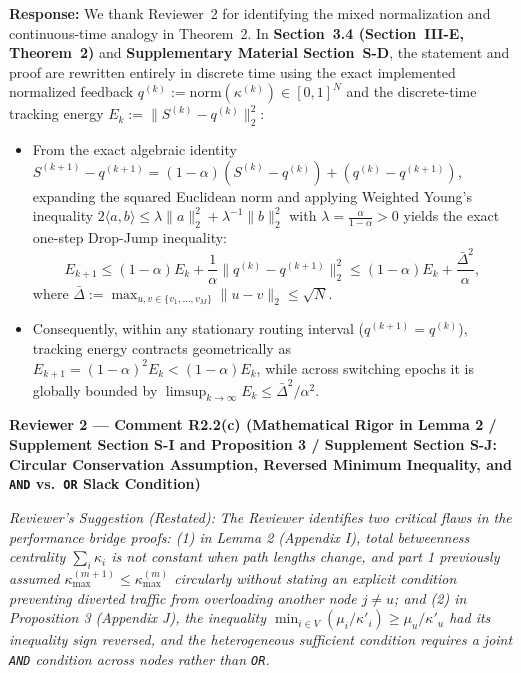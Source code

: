 \documentclass[11pt,a4paper]{article}
\newcommand{\cbox}[2]{%
  \vspace{0.6em}\noindent\textbf{#1}\par\smallskip
  \noindent\textit{Reviewer's Suggestion (Restated):} \textit{#2}\par\smallskip
}
\begin{document}
\noindent\textbf{Response:} We thank Reviewer~2 for identifying the mixed normalization and continuous-time analogy in Theorem~2. In \textbf{Section~3.4 (Section~III-E, Theorem~2)} and \textbf{Supplementary Material Section~S-D}, the statement and proof are rewritten entirely in discrete time using the exact implemented normalized feedback $q^{(k)} := \mathrm{norm}(\kappa^{(k)}) \in [0,1]^N$ and the discrete-time tracking energy $E_k := \|S^{(k)} - q^{(k)}\|_2^2$:
\begin{itemize}[leftmargin=1.8em]
    \item From the exact algebraic identity $S^{(k+1)} - q^{(k+1)} = (1-\alpha)(S^{(k)} - q^{(k)}) + (q^{(k)} - q^{(k+1)})$, expanding the squared Euclidean norm and applying Weighted Young's inequality $2\langle a, b\rangle \le \lambda\|a\|_2^2 + \lambda^{-1}\|b\|_2^2$ with $\lambda = \frac{\alpha}{1-\alpha} > 0$ yields the exact one-step Drop-Jump inequality:
    \[
        E_{k+1} \le (1-\alpha)E_k + \frac{1}{\alpha}\big\|q^{(k)} - q^{(k+1)}\big\|_2^2 \le (1-\alpha)E_k + \frac{\bar{\Delta}^2}{\alpha},
    \]
    where $\bar{\Delta} := \max_{u,v \in \{v_1,\dots,v_M\}}\|u-v\|_2 \le \sqrt{N}$.
    \item Consequently, within any stationary routing interval ($q^{(k+1)}=q^{(k)}$), tracking energy contracts geometrically as $E_{k+1} = (1-\alpha)^2 E_k < (1-\alpha)E_k$, while across switching epochs it is globally bounded by $\limsup_{k\to\infty} E_k \le \bar{\Delta}^2/\alpha^2$.
\end{itemize}

\hrulefill

\cbox{Reviewer 2 --- Comment R2.2(c) (Mathematical Rigor in Lemma 2 / Supplement Section S-I and Proposition 3 / Supplement Section S-J: Circular Conservation Assumption, Reversed Minimum Inequality, and \texttt{AND} vs.\ \texttt{OR} Slack Condition)}{The Reviewer identifies two critical flaws in the performance bridge proofs: (1) in Lemma 2 (Appendix I), total betweenness centrality $\sum_i \kappa_i$ is not constant when path lengths change, and part 1 previously assumed $\kappa_{\max}^{(m+1)} \le \kappa_{\max}^{(m)}$ circularly without stating an explicit condition preventing diverted traffic from overloading another node $j \neq u$; and (2) in Proposition 3 (Appendix J), the inequality $\min_{i\in V}(\mu_i/\kappa'_i) \ge \mu_u/\kappa'_u$ had its inequality sign reversed, and the heterogeneous sufficient condition requires a joint \texttt{AND} condition across nodes rather than \texttt{OR}.}
\end{document}
